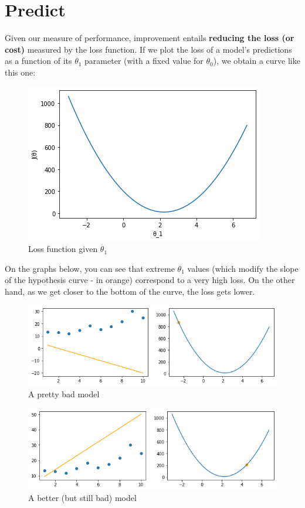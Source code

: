 \section*{Predict}
Given our measure of performance, improvement entails \textbf{reducing the loss (or cost)} measured by the loss function.
If we plot the loss of a model's predictions as a function of its $\theta_1$ parameter (with a fixed value for $\theta_0$), we obtain a curve like this one:
\begin{figure}[!h]
  \centering
  \includegraphics[scale=0.6]{assets/ex03_interlude_cost.png}
  \caption{Loss function given $\theta_1$}
\end{figure}
On the graphs below, you can see that extreme $\theta_1$ values (which modify the slope of the hypothesis curve - in orange) correspond to a very high loss.
On the other hand, as we get closer to the bottom of the curve, the loss gets lower.

\begin{figure}[!h]
  \centering
  \includegraphics[scale=0.6]{assets/ex03_cost_1.png}
  \caption{A pretty bad model}
\end{figure}

\begin{figure}[!h]
  \centering
  \includegraphics[scale=0.6]{assets/ex03_cost_2.png}
  \caption{A better (but still bad) model}
\end{figure}

